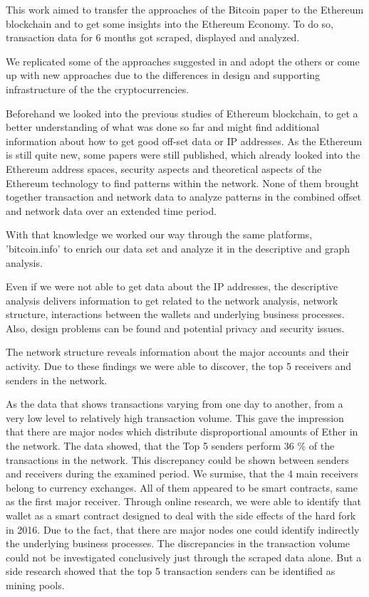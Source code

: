 This work aimed to transfer the approaches of the Bitcoin paper \cite{lischke2016analyzing} to the Ethereum blockchain and to get some insights into the Ethereum Economy. 
To do so, transaction data for 6 months got scraped, displayed and analyzed.

We replicated some of the approaches suggested in \cite{lischke2016analyzing} and adopt the others or come up with new approaches due to the differences in design and supporting infrastructure of the the cryptocurrencies.

Beforehand we looked into the previous studies of Ethereum blockchain, to get a better understanding of what was done so far and might find additional information about how to get good off-set data or IP addresses.
As the Ethereum is still quite new, some papers were still published, which already looked into the Ethereum address spaces, security aspects and theoretical aspects of the Ethereum technology to find patterns within the network.
None of them brought together transaction and network data to analyze patterns in the combined offset and network data over an extended time period.

With that knowledge we worked our way through the same platforms, 'bitcoin.info' to enrich our data set and analyze it in the descriptive and graph analysis.

Even if we were not able to get data about the IP addresses, the descriptive analysis delivers information to get related to the network analysis, network structure, interactions between the wallets and underlying business processes.
Also, design problems can be found and potential privacy and security issues.

The network structure reveals information about the major accounts and their activity. 
Due to these findings we were able to discover, the top 5 receivers and senders in the network.

As the data that shows transactions varying from one day to another, from a very low level to relatively high transaction volume.
This gave the impression that there are major nodes which distribute disproportional amounts of Ether in the network. 
The data showed, that the Top 5 senders perform 36 \% of the transactions in the network. 
This discrepancy could be shown between senders and receivers during the examined period. 
We surmise, that the 4 main receivers belong to currency exchanges. 
All of them appeared to be smart contracts, same as the first major receiver. 
Through online research, we were able to identify that wallet as a smart contract designed to deal with the side effects of the hard fork in 2016.
Due to the fact, that there are major nodes one could identify indirectly the underlying business processes. 
The discrepancies in the transaction volume could not be investigated conclusively just through the scraped data alone. 
But a side research showed that the top 5 transaction senders can be identified as mining pools.


